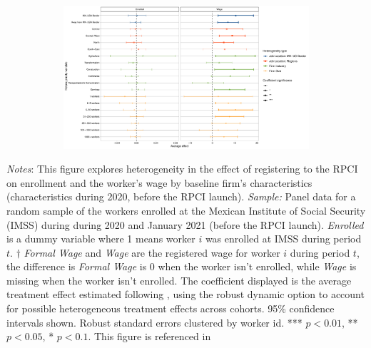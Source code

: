 \begin{figure}[H]
    \centering
    \caption{Heterogeneity by firm characteristics \label{fig:heterogeneity_firm_rpci}}
    
    \begin{subfigure}{\textwidth}
    \includegraphics[width=\textwidth]{04_Figures/muestra_10porciento/dcdh_heterogeneity_firm_characteristics_paper.pdf}
    \end{subfigure}
    
\end{figure}

\scriptsize{
\noindent \textit{Notes}: This figure explores heterogeneity in the effect of registering to the RPCI on enrollment and the worker's wage by baseline firm's characteristics (characteristics during 2020, before the RPCI launch). \textit{Sample:} Panel data for a random sample of the workers enrolled at the Mexican Institute of Social Security (IMSS) during during 2020 and January 2021 (before the RPCI launch). \textit{Enrolled} is a dummy variable where 1 means worker $i$ was enrolled at IMSS during period $t$. $\dagger$ \textit{Formal Wage} and \textit{Wage} are the registered wage for worker $i$ during period $t$, the difference is \textit{Formal Wage} is 0 when the worker isn't enrolled, while \textit{Wage} is missing when the worker isn't enrolled. The coefficient displayed is the average treatment effect estimated following \cite{de2020two}, using the robust dynamic option to account for possible heterogeneous treatment effects across cohorts. 95\% confidence intervals shown. Robust standard errors clustered by worker id. *** $p<0.01$, ** $p<0.05$, * $p<0.1$. This figure is referenced in %
}



%
%
%

%




% 